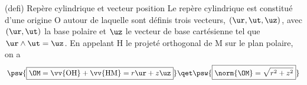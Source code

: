 \documentclass[../../main/main.tex]{subfiles}
\begin{document}
\begin{tcb*}[sidebyside, righthand ratio=.25](defi)
	{Repère cylindrique et vecteur position}
	Le repère cylindrique est constitué d'une origine O autour de laquelle sont
	définis trois vecteurs, $(\ur,\ut,\uz)$, avec $(\ur,\ut)$ la base polaire et
	$\uz$ le vecteur de base cartésienne tel que $\ur \wedge \ut = \uz$.
	\bigbreak
	En appelant H le projeté orthogonal de M sur le plan polaire, on a
	\[
		\psw{\boxed{\OM = \vv{\rm OH} + \vv{\rm HM} = r\ur + z\uz}}
		\qet
		\psw{\boxed{\norm{\OM} = \sqrt{r^2 + z^2}}}
	\]
	\tcblower
	\begin{center}
\end{center}
\end{tcb*}
\end{document}
